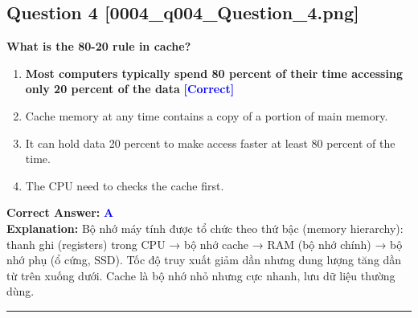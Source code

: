 \documentclass[11pt,a4paper]{article}
\begin{document}
\begin{minipage}{\textwidth}
\subsection*{Question 4 \quad \footnotesize{[0004\_q004\_Question\_4.png]}}
\noindent \textbf{What is the 80-20 rule in cache?}

\begin{enumerate}[label=\Alph*.]
    \item \textbf{Most computers typically spend 80 percent of their time accessing only 20 percent of the data} \hfill \textcolor{blue}{\textbf{[Correct]}}
    \item Cache memory at any time contains a copy of a portion of main memory.
    \item It can hold data 20 percent to make access faster at least 80 percent of the time.
    \item The CPU need to checks the cache first.
\end{enumerate}

\noindent \textbf{Correct Answer:} \textcolor{blue}{\textbf{A}} \\[2pt]
\noindent \textbf{Explanation:} Bộ nhớ máy tính được tổ chức theo thứ bậc (memory hierarchy): thanh ghi (registers) trong CPU → bộ nhớ cache → RAM (bộ nhớ chính) → bộ nhớ phụ (ổ cứng, SSD). Tốc độ truy xuất giảm dần nhưng dung lượng tăng dần từ trên xuống dưới. Cache là bộ nhớ nhỏ nhưng cực nhanh, lưu dữ liệu thường dùng.

\par\vspace{0.3cm}
\hrule
\vspace{0.3cm}
\end{minipage}
\end{document}
